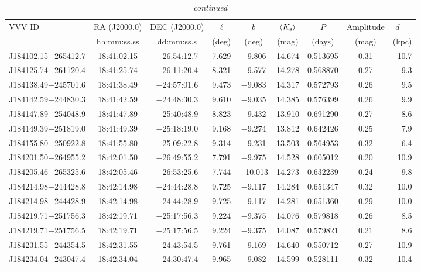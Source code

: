 \begin{table*}
\centering
\caption[]{{\it continued}}
\begin{tabular}{lcccccccr}
\hline \hline
VVV ID & RA (J2000.0)  & DEC (J2000.0) & $\ell$ & $b$ &  $\langle K_{\rm s} \rangle$ & $P$ & Amplitude & $d$~~~ \\
     & hh:mm:ss.ss    & dd:mm:ss.s   &  (deg) & (deg) &   (mag)       & (days) & (mag) & (kpc)   \\
\hline
J184102.15$-$265412.7 & 18:41:02.15 & $-$26:54:12.7 &  7.629 & $-$9.806 & 14.674 & 0.513695 & 0.31 & 10.7 \\
J184125.74$-$261120.4 & 18:41:25.74 & $-$26:11:20.4 &  8.321 & $-$9.577 & 14.278 & 0.568870 & 0.27 & 9.3 \\
J184138.49$-$245701.6 & 18:41:38.49 & $-$24:57:01.6 &  9.473 & $-$9.083 & 14.317 & 0.572793 & 0.26 & 9.5 \\
J184142.59$-$244830.3 & 18:41:42.59 & $-$24:48:30.3 &  9.610 & $-$9.035 & 14.385 & 0.576399 & 0.26 & 9.9 \\
J184147.89$-$254048.9 & 18:41:47.89 & $-$25:40:48.9 &  8.823 & $-$9.432 & 13.910 & 0.691290 & 0.27 & 8.6 \\
J184149.39$-$251819.0 & 18:41:49.39 & $-$25:18:19.0 &  9.168 & $-$9.274 & 13.812 & 0.642426 & 0.25 & 7.9 \\
J184155.80$-$250922.8 & 18:41:55.80 & $-$25:09:22.8 &  9.314 & $-$9.231 & 13.503 & 0.564953 & 0.32 & 6.4 \\
J184201.50$-$264955.2 & 18:42:01.50 & $-$26:49:55.2 &  7.791 & $-$9.975 & 14.528 & 0.605012 & 0.20 & 10.9 \\
J184205.46$-$265325.6 & 18:42:05.46 & $-$26:53:25.6 &  7.744 & $-$10.013 & 14.273 & 0.632239 & 0.24 & 9.8 \\
J184214.98$-$244428.8 & 18:42:14.98 & $-$24:44:28.8 &  9.725 & $-$9.117 & 14.284 & 0.651347 & 0.32 & 10.0 \\
J184214.98$-$244428.9 & 18:42:14.98 & $-$24:44:28.9 &  9.725 & $-$9.117 & 14.281 & 0.651360 & 0.29 & 10.0 \\
J184219.71$-$251756.3 & 18:42:19.71 & $-$25:17:56.3 &  9.224 & $-$9.375 & 14.076 & 0.579818 & 0.26 & 8.5 \\
J184219.71$-$251756.5 & 18:42:19.71 & $-$25:17:56.5 &  9.224 & $-$9.375 & 14.087 & 0.579821 & 0.21 & 8.6 \\
J184231.55$-$244354.5 & 18:42:31.55 & $-$24:43:54.5 &  9.761 & $-$9.169 & 14.640 & 0.550712 & 0.27 & 10.9 \\
J184234.04$-$243047.4 & 18:42:34.04 & $-$24:30:47.4 &  9.965 & $-$9.082 & 14.599 & 0.528111 & 0.32 & 10.4 \\

\end{tabular}
\end{table*}

